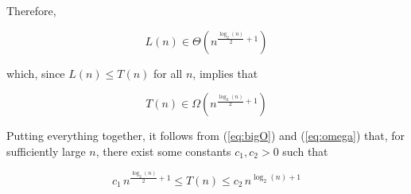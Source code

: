 \documentclass[a4paper,10pt]{article}
\begin{document}
Therefore,

$$L(n) \in \Theta \left(n^{\frac{\log_2(n)}{2} + 1} \right)$$

which, since $L(n) \leq T(n)$ for all $n$, implies that

\begin{equation}
\label{eq:omega}
    T(n) \in \Omega \left(n^{\frac{\log_2(n)}{2} + 1}\right)
\end{equation}

\vspace{1cm}

Putting everything together, it follows from (\ref{eq:bigO}) and (\ref{eq:omega}) that, for sufficiently large $n$, there exist some constants $c_1, c_2 > 0$ such that

$$c_1 \, n^{\frac{\log_2(n)}{2} + 1} \leq T(n) \leq c_2 \, n^{{\log_2(n) + 1}}$$

 

\end{document}
